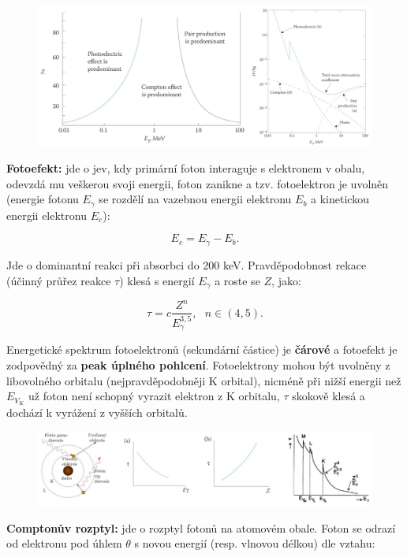 \begin{figure}[H]
    \centering
    \includegraphics[width=1\textwidth]{img/interakce.JPG}
\end{figure}

\textbf{Fotoefekt:} jde o jev, kdy primární foton interaguje s elektronem v obalu, odevzdá mu veškerou svoji energii, foton zanikne a tzv. fotoelektron je uvolněn (energie fotonu $E_\gamma$ se rozdělí na vazebnou energii elektronu $E_b$ a kinetickou energii elektronu $E_e$):

$$ E_e = E_\gamma - E_b. $$

Jde o dominantní reakci při absorbci do 200 keV. Pravděpodobnost rekace (účinný průřez reakce $\tau$) klesá s energií $E_\gamma$ a roste se $Z$, jako:

$$ \tau = c \dfrac{Z^n}{E_\gamma^{3,5}}, \: \: \: n \in (4,5). $$

Energetické spektrum fotoelektronů (sekundární částice) je \textbf{čárové} a fotoefekt je zodpovědný za \textbf{peak úplného pohlcení}. Fotoelektrony mohou být uvolněny z libovolného orbitalu (nejpravděpodobněji K orbital), nicméně při nižší energii než $E_{V_K}$ už foton není schopný vyrazit elektron z K orbitalu, $\tau$ skokově klesá a dochází k vyrážení z vyšších orbitalů.

\begin{figure}[H]
    \centering
    \includegraphics[width=1\textwidth]{img/fotoefekt.JPG}
\end{figure}

\textbf{Comptonův rozptyl:} jde o rozptyl fotonů na atomovém obale. Foton se odrazí od elektronu pod úhlem $\theta$ s novou energií (resp. vlnovou délkou) dle vztahu:

